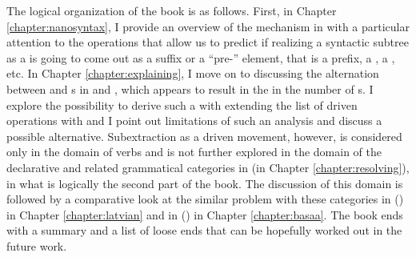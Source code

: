 The logical organization of the book is as follows. First, in Chapter \ref{chapter:nanosyntax}, I provide an overview of the  mechanism in  with a particular attention to the operations that allow us to predict if realizing a syntactic subtree as a  is going to come out as a suffix or a ``pre-'' element, that is a prefix, a , a , etc. In Chapter \ref{chapter:explaining}, I move on to discussing the alternation between  and  s in  and , which appears to result in the  in the number of s. I explore the possibility to derive such a  with extending the list of  driven operations with  and I point out limitations of such an analysis and discuss a possible alternative.  Subextraction as a  driven movement, however, is considered  only in the domain of  verbs  and is not further explored in the domain of the declarative  and related grammatical categories in  (in Chapter \ref{chapter:resolving}), in what is logically the second part of the book. The discussion of this domain is followed by a comparative look at the similar problem with these categories in  () in Chapter \ref{chapter:latvian} and in  () in Chapter \ref{chapter:basaa}. The book ends with a summary and a list of loose ends that can be hopefully worked out in the future work.
